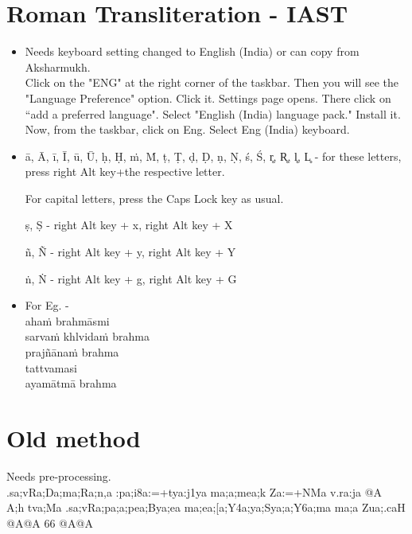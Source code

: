 \documentclass{article}
\begin{document}
\section{Roman Transliteration - IAST}
\begin{Large}
    \begin{itemize}
    \item Needs keyboard setting changed to English (India) or can copy from Aksharmukh.\\
    Click on the "ENG" at the right corner of the taskbar. Then you will see the "Language Preference" option. Click it. Settings page opens. There click on ``add a preferred language". Select "English (India) language pack." Install it. Now, from the taskbar, click on Eng. Select Eng (India) keyboard.
    \item ā, Ā, ī, Ī, ū, Ū, ḥ, Ḥ, ṁ, Ṁ, ṭ, Ṭ, ḍ, Ḍ, ṇ, Ṇ, ś, Ś, r̥, R̥, l̥, L̥ - for these letters, press right Alt key+the respective letter.

For capital letters, press the Caps Lock key as usual.

ṣ, Ṣ - right Alt key + x, right Alt key + X 

ñ, Ñ - right Alt key + y, right Alt key + Y

ṅ, Ṅ - right Alt key + g, right Alt key + G
\item For Eg. -\\
\scriptsize ahaṁ brahmāsmi\\
\small sarvaṁ khlvidaṁ brahma\\
\large prajñānaṁ brahma\\
\Large tattvamasi\\
\huge ayamātmā brahma
\end{itemize}
\end{Large}

\pagebreak

\section{Old method}
\Large Needs pre-processing.\\
{\skt .sa;vRa;Da;ma;Ra;n,a :pa;i8a:=+tya:j1ya ma;a;mea;k Za:=+NMa
v.ra:ja @A \\
 A;h tva;Ma .sa;vRa;pa;a;pea;Bya;ea ma;ea;[a;Y4a;ya;Sya;a;Y6a;ma
ma;a Zua;.caH @A@A 66 @A@A}
\end{document}
